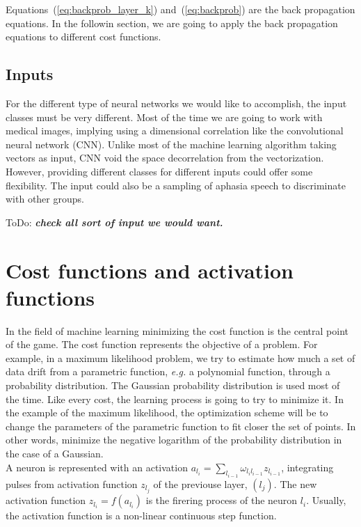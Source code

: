 \documentclass[final, paper=letter,5p,times,twocolumn]{elsarticle}
\newcommand{\ToDo}[1]{ToDo: \textbf{\textit{#1}}}
\begin{document}
Equations~(\ref{eq:backprob_layer_k}) and~(\ref{eq:backprob}) are the back propagation equations. In the followin section, we are going to apply the back propagation equations to different cost functions.


\subsection{Inputs}
For the different type of neural networks we would like to accomplish, the input classes must be very different. Most of the time we are going to work with medical images, implying using a dimensional correlation like the convolutional neural network (CNN). Unlike most of the machine learning algorithm taking vectors as input, CNN void the space decorrelation from the vectorization. However, providing different classes for different inputs could offer some flexibility. The input could also be a sampling of aphasia speech to discriminate with other groups.

\ToDo{check all sort of input we would want.} \\

\section{Cost functions and activation functions}

In the field of machine learning minimizing the cost function is the central point of the game. The cost function represents the objective of a problem. For example, in a maximum likelihood problem, we try to estimate how much a set of data drift from a parametric function, {\it e.g.} a polynomial function, through a probability distribution. The Gaussian probability distribution is used most of the time. Like every cost, the learning process is going to try to minimize it. In the example of the maximum likelihood, the optimization scheme will be to change the parameters of the parametric function to fit closer the set of points. In other words, minimize the negative logarithm of the probability distribution in the case of a Gaussian. \\
A neuron is represented with an activation $a_{l_{i}} = \sum_{l_{i-1}}\omega_{l_{i}l_{i-1}} z_{l_{i-1}}$, integrating pulses from activation function $z_{l_{j}}$ of the previouse layer, $(l_{j})$. The new activation function $z_{l_{i}} = f(a_{l_{i}})$ is the firering process of the neuron $l_{i}$. Usually, the activation function is a non-linear continuous step function. 
\end{document}
